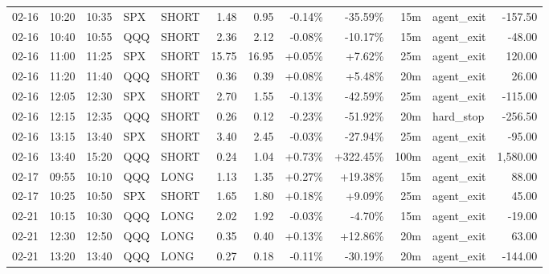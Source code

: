 \documentclass[11pt,a4paper]{article}
\begin{document}
\begin{center}
\begin{longtable}{>{\color{txtmain}}l l l l l r r r r r >{\color{txtmain}}l r}
02-16 & 10:20 & 10:35 & SPX & SHORT & 1.48 & 0.95 & \textcolor{lossred}{-0.14\%} & \textcolor{lossred}{-35.59\%} & 15m & agent\_exit & \textcolor{lossred}{-157.50} \\
02-16 & 10:40 & 10:55 & QQQ & SHORT & 2.36 & 2.12 & \textcolor{lossred}{-0.08\%} & \textcolor{lossred}{-10.17\%} & 15m & agent\_exit & \textcolor{lossred}{-48.00} \\
02-16 & 11:00 & 11:25 & SPX & SHORT & 15.75 & 16.95 & \textcolor{wingreen}{+0.05\%} & \textcolor{wingreen}{+7.62\%} & 25m & agent\_exit & \textcolor{wingreen}{120.00} \\
02-16 & 11:20 & 11:40 & QQQ & SHORT & 0.36 & 0.39 & \textcolor{wingreen}{+0.08\%} & \textcolor{wingreen}{+5.48\%} & 20m & agent\_exit & \textcolor{wingreen}{26.00} \\
02-16 & 12:05 & 12:30 & SPX & SHORT & 2.70 & 1.55 & \textcolor{lossred}{-0.13\%} & \textcolor{lossred}{-42.59\%} & 25m & agent\_exit & \textcolor{lossred}{-115.00} \\
02-16 & 12:15 & 12:35 & QQQ & SHORT & 0.26 & 0.12 & \textcolor{lossred}{-0.23\%} & \textcolor{lossred}{-51.92\%} & 20m & hard\_stop & \textcolor{lossred}{-256.50} \\
02-16 & 13:15 & 13:40 & SPX & SHORT & 3.40 & 2.45 & \textcolor{lossred}{-0.03\%} & \textcolor{lossred}{-27.94\%} & 25m & agent\_exit & \textcolor{lossred}{-95.00} \\
02-16 & 13:40 & 15:20 & QQQ & SHORT & 0.24 & 1.04 & \textcolor{wingreen}{+0.73\%} & \textcolor{wingreen}{+322.45\%} & 100m & agent\_exit & \textcolor{wingreen}{1,580.00} \\
02-17 & 09:55 & 10:10 & QQQ & LONG & 1.13 & 1.35 & \textcolor{wingreen}{+0.27\%} & \textcolor{wingreen}{+19.38\%} & 15m & agent\_exit & \textcolor{wingreen}{88.00} \\
02-17 & 10:25 & 10:50 & SPX & SHORT & 1.65 & 1.80 & \textcolor{wingreen}{+0.18\%} & \textcolor{wingreen}{+9.09\%} & 25m & agent\_exit & \textcolor{wingreen}{45.00} \\
02-21 & 10:15 & 10:30 & QQQ & LONG & 2.02 & 1.92 & \textcolor{lossred}{-0.03\%} & \textcolor{lossred}{-4.70\%} & 15m & agent\_exit & \textcolor{lossred}{-19.00} \\
02-21 & 12:30 & 12:50 & QQQ & LONG & 0.35 & 0.40 & \textcolor{wingreen}{+0.13\%} & \textcolor{wingreen}{+12.86\%} & 20m & agent\_exit & \textcolor{wingreen}{63.00} \\
02-21 & 13:20 & 13:40 & QQQ & LONG & 0.27 & 0.18 & \textcolor{lossred}{-0.11\%} & \textcolor{lossred}{-30.19\%} & 20m & agent\_exit & \textcolor{lossred}{-144.00} \\

\end{longtable}
\end{center}
\end{document}
